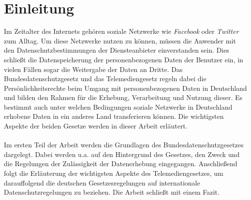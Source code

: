 \chapter{Einleitung}
Im Zeitalter des Internets gehören soziale Netzwerke wie \textit{Facebook} oder \textit{Twitter} zum Alltag. Um diese Netzwerke nutzen zu können, müssen die Anwender mit den Datenschutzbestimmungen der Diensteanbieter einverstanden sein. Dies schließt die Datenspeicherung der personenbezogenen Daten der Benutzer ein, in vielen Fällen sogar die Weitergabe der Daten an Dritte. Das Bundesdatenschutzgesetz und das Telemediengesetz regeln dabei die Persönlichkeitsrechte beim Umgang mit personenbezogenen Daten in Deutschland und bilden den Rahmen für die Erhebung, Verarbeitung und Nutzung dieser. Es bestimmt auch unter welchen Bedingungen soziale Netzwerke in Deutschland erhobene Daten in ein anderes Land transferieren können. Die wichtigsten Aspekte der beiden Gesetze werden in dieser Arbeit erläutert.\\
\\Im ersten Teil der Arbeit werden die Grundlagen des Bundesdatenschutzgesetzes dargelegt. Dabei werden u.a. auf den Hintergrund des Gesetzes, den Zweck und die Regelungen der Zulässigkeit der Datenerhebung eingegangen. Anschließend folgt die Erläuterung der wichtigsten Aspekte des Telemediengesetzes, um darauffolgend die deutschen Gesetzesregelungen auf internationale Datenschutzregelungen zu beziehen. Die Arbeit schließt mit einem Fazit.